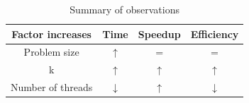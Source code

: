 \documentclass[a4paper, 11pt, margin=1in]{article}
\begin{document}
\begin{table}[h]
    \centering
    \begin{tabular}{|c|c|c|c|}
    \hline
        Factor increases & Time & Speedup & Efficiency  \\ \hline \hline
        Problem size  & $\uparrow$ & = & = \\ \hline
        k & $\uparrow$ & $\uparrow$ & $\uparrow$ \\ \hline
        Number of threads & $\downarrow$ & $\uparrow$ & $\downarrow$ \\ \hline
    \end{tabular}
    \caption{Summary of observations}
    \label{tab:my_label}
\end{table}
\end{document}
